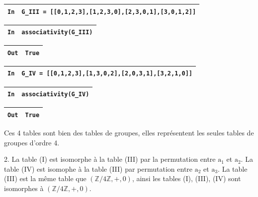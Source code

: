 \documentclass[titlepage]{article}
\begin{document}
    \begin{tabularx}{11.5cm}{|p{0.60cm}|X|}
        \hline
        \verb|In|
        & 
        \verb|G_III = [[0,1,2,3],[1,2,3,0],[2,3,0,1],[3,0,1,2]]|
        \\
        \hline
    \end{tabularx}\newline
    \begin{tabularx}{11.5cm}{|p{0.60cm}|X|}
        \hline
        \verb|In|
        & 
        \verb|associativity(G_III)|
        \\
        \hline
    \end{tabularx}\newline
    \begin{tabularx}{11.5cm}{|p{0.60cm}|X|}
        \hline
        \verb|Out|
        & 
        \verb|True|
        \\
        \hline
    \end{tabularx}\newline\newline

    \begin{tabularx}{11.5cm}{|p{0.60cm}|X|}
        \hline
        \verb|In|
        & 
        \verb|G_IV = [[0,1,2,3],[1,3,0,2],[2,0,3,1],[3,2,1,0]]|
        \\
        \hline
    \end{tabularx}\newline
    \begin{tabularx}{11.5cm}{|p{0.60cm}|X|}
        \hline
        \verb|In|
        & 
        \verb|associativity(G_IV)|
        \\
        \hline
    \end{tabularx}\newline
    \begin{tabularx}{11.5cm}{|p{0.60cm}|X|}
        \hline
        \verb|Out|
        & 
        \verb|True|
        \\
        \hline
    \end{tabularx}\newline

    Ces 4 tables sont bien des tables de groupes, elles représentent les seules tables de groupes d'ordre 4.\newline

    2. La table (I) est isomorphe à la table (III) par la permutation entre $\textrm{a}_\textrm{1}$ et $\textrm{a}_\textrm{2}$. 
    La table (IV) est isomophe à la table (III) par permutation entre $\textrm{a}_\textrm{2}$ et $\textrm{a}_\textrm{3}$.
    La table (III) est la même table que $(\mathbb{Z}/4\mathbb{Z}, +, 0)$, ainsi les tables (I), (III), (IV) sont isomorphes à $(\mathbb{Z}/4\mathbb{Z}, +, 0)$.\newline
\end{document}
